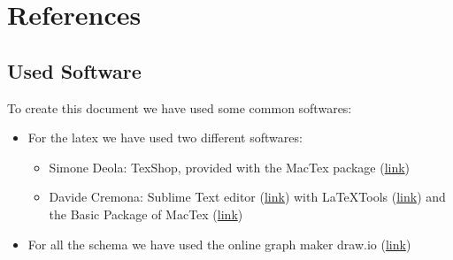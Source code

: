 \documentclass[../../dd.tex]{subfiles}
\begin{document}
	\chapter{References}
		\section{Used Software}
		To create this document we have used some common softwares:
		\begin{itemize}
			\item For the latex we have used two different softwares:
			\begin{itemize}
			
			\item Simone Deola: TexShop, provided with the MacTex package 					(\href{https://tug.org/mactex/}{link})
			
		\item Davide Cremona: Sublime Text editor (\href{http://www.sublimetext.com}{link}) with LaTeXTools (\href{https://github.com/SublimeText/LaTeXTools}{link}) and the Basic Package of MacTex (\href{https://tug.org/mactex/}{link})

			\end{itemize}
			
			\item For all the schema we have used the online graph maker draw.io (\href{https://www.draw.io}{link})
		\end{itemize}
		
\end{document}
